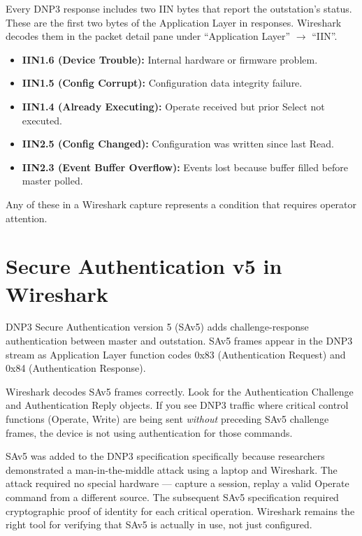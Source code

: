 \documentclass[12pt,twoside,openright]{memoir}
\begin{document}
Every DNP3 response includes two IIN bytes that report the outstation's status. These are the first two bytes of the Application Layer in responses. Wireshark decodes them in the packet detail pane under ``Application Layer'' $\to$ ``IIN''.

\begin{keyconcept}[title={Critical IIN Bits to Monitor}]
\begin{itemize}[noitemsep]
  \item \textbf{IIN1.6 (Device Trouble):} Internal hardware or firmware problem.
  \item \textbf{IIN1.5 (Config Corrupt):} Configuration data integrity failure.
  \item \textbf{IIN1.4 (Already Executing):} Operate received but prior Select not executed.
  \item \textbf{IIN2.5 (Config Changed):} Configuration was written since last Read.
  \item \textbf{IIN2.3 (Event Buffer Overflow):} Events lost because buffer filled before master polled.
\end{itemize}
Any of these in a Wireshark capture represents a condition that requires operator attention.
\end{keyconcept}

\section{Secure Authentication v5 in Wireshark}

DNP3 Secure Authentication version 5 (SAv5) adds challenge-response authentication between master and outstation. SAv5 frames appear in the DNP3 stream as Application Layer function codes 0x83 (Authentication Request) and 0x84 (Authentication Response).

Wireshark decodes SAv5 frames correctly. Look for the Authentication Challenge and Authentication Reply objects. If you see DNP3 traffic where critical control functions (Operate, Write) are being sent \textit{without} preceding SAv5 challenge frames, the device is not using authentication for those commands.

\begin{fieldnote}
SAv5 was added to the DNP3 specification specifically because researchers demonstrated a man-in-the-middle attack using a laptop and Wireshark. The attack required no special hardware --- capture a session, replay a valid Operate command from a different source. The subsequent SAv5 specification required cryptographic proof of identity for each critical operation. Wireshark remains the right tool for verifying that SAv5 is actually in use, not just configured.
\end{fieldnote}
\end{document}
